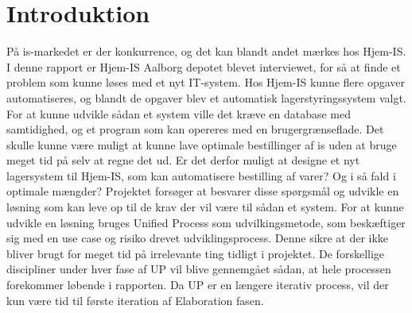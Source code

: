 \chapter{Introduktion}\label{ch:introduction}
På is-markedet er der konkurrence, og det kan blandt andet mærkes hos Hjem-IS. I denne rapport er Hjem-IS Aalborg depotet blevet interviewet, for så at finde et problem som kunne løses med et nyt IT-system.  
Hos Hjem-IS kunne flere opgaver automatiseres, og blandt de opgaver blev et automatisk lagerstyringssystem valgt. For at kunne udvikle sådan et system ville det kræve en database med samtidighed, og et program som kan opereres med en brugergrænseflade. 
Det skulle kunne være muligt at kunne lave optimale bestillinger af is uden at bruge meget tid på selv at regne det ud. Er det derfor muligt at designe et nyt lagersystem til Hjem-IS, som kan automatisere bestilling af varer? Og i så fald i optimale mængder? 
Projektet forsøger at besvarer disse spørgsmål og udvikle en løsning som kan leve op til de krav der vil være til sådan et system. For at kunne udvikle en løsning bruges Unified Process\cite{UnifiedProcess} som udvilkingsmetode, som beskæftiger sig med en use case og risiko drevet udviklingsprocess. Denne sikre at der ikke bliver brugt for meget tid på irrelevante ting tidligt i projektet. De forskellige discipliner under hver fase af UP vil blive gennemgået sådan, at hele processen forekommer løbende i rapporten. Da UP er en længere iterativ process, vil der kun være tid til første iteration af Elaboration fasen\cite{UnifiedProcess}.